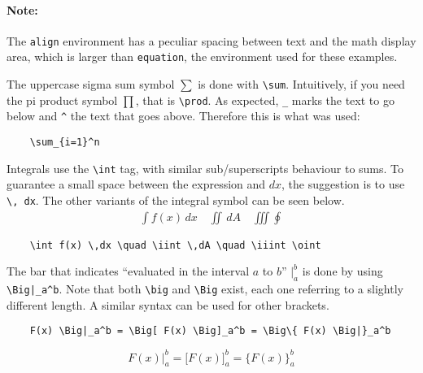 \paragraph{Note:}
The \verb|align| environment has a peculiar spacing between text and the math display area, which is larger than \verb|equation|, the environment used for these examples.

The uppercase sigma sum symbol \( \sum \) is done with \verb|\sum|.
Intuitively, if you need the pi product symbol \( \prod \), that is \verb|\prod|.
As expected, \verb|_| marks the text to go below and \verb|^| the text that goes above.
Therefore this is what was used: 
\begin{lstlisting}
    \sum_{i=1}^n
\end{lstlisting} 

Integrals use the \verb|\int| tag, with similar sub/superscripts behaviour to sums.
To guarantee a small space between the expression and \( dx \), the suggestion is to use \verb|\, dx|.
The other variants of the integral symbol can be seen below.
\begin{align*}
    \int f(x) \,dx \quad \iint \,dA \quad \iiint \oint 
\end{align*}
\begin{lstlisting}
    \int f(x) \,dx \quad \iint \,dA \quad \iiint \oint 
\end{lstlisting}

The bar that indicates ``evaluated in the interval \( a \) to \( b \)'' \( \Big|_a^b \) is done by using \verb!\Big|_a^b!.
Note that both \verb|\big| and \verb|\Big| exist, each one referring to a slightly different length. 
A similar syntax can be used for other brackets.
\begin{lstlisting}
    F(x) \Big|_a^b = \Big[ F(x) \Big]_a^b = \Big\{ F(x) \Big|}_a^b
\end{lstlisting}
\begin{equation*}
    F(x) \Big|_a^b = \Big[ F(x) \Big]_a^b = \Big \{ F(x) \Big \}_a^b
\end{equation*}